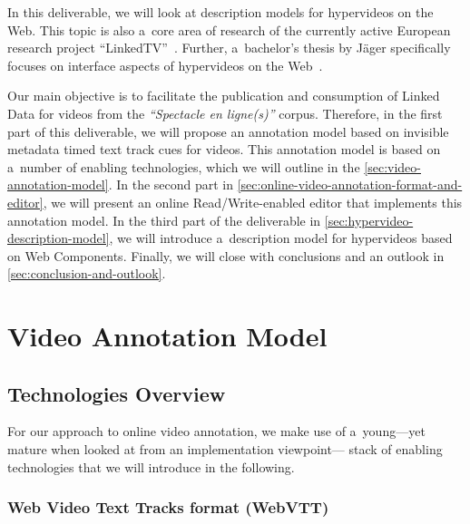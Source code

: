 \documentclass[runningheads,a4paper]{llncs}
\begin{document}
In this deliverable, we will look at
description models for hypervideos on the Web.
This topic is also a~core area of research of the currently active
European research project ``LinkedTV''~\cite{linkedtv2012hypervideo}.
Further, a~bachelor's thesis by Jäger specifically focuses on interface aspects
of hypervideos on the Web~\cite{jaeger2012hypervideo}.

Our main objective is to facilitate the publication and consumption
of Linked Data for videos from the \emph{``Spectacle en ligne(s)''} corpus.
Therefore, in the first part of this deliverable,
we will propose an annotation model
based on invisible metadata timed text track cues for videos.
This annotation model is based on a~number of enabling technologies,
which we will outline in the \autoref{sec:video-annotation-model}.
In the second part in \autoref{sec:online-video-annotation-format-and-editor},
we will present an online Read/Write-enabled editor
that implements this annotation model.
In the third part of the deliverable in \autoref{sec:hypervideo-description-model},
we will introduce a~description model for hypervideos
based on Web Components.
Finally, we will close with conclusions and an outlook
in \autoref{sec:conclusion-and-outlook}.

\section{Video Annotation Model}
\label{sec:video-annotation-model}

\subsection{Technologies Overview}

For our approach to online video annotation,
we make use of a~young---yet mature
when looked at from an implementation viewpoint---%
stack of enabling technologies that we will introduce in the following.

\subsubsection{Web Video Text Tracks format (WebVTT)}
\end{document}
